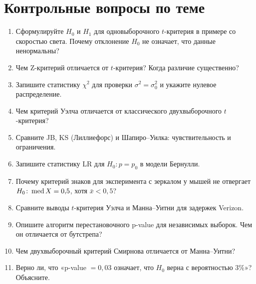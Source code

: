 \section{Контрольные вопросы по теме}

\begin{enumerate}
    \item Сформулируйте $H_0$ и $H_1$ для одновыборочного $t$-критерия
          в примере со скоростью света. Почему отклонение $H_0$ не означает, что данные ненормальны?
    \item Чем Z-критерий отличается от $t$-критерия? Когда различие существенно?
    \item Запишите статистику $\chi^2$ для проверки $\sigma^2=\sigma_0^2$
          и укажите нулевое распределение.
    \item Чем критерий Уэлча отличается от классического двухвыборочного
          $t$-критерия?
    \item Сравните JB, KS (Лиллиефорс) и Шапиро--Уилка: чувствительность
          и ограничения.
    \item Запишите статистику LR для $H_0\colon p=p_0$ в модели Бернулли.
    \item Почему критерий знаков для эксперимента с зеркалом у мышей не отвергает
          $H_0\colon \operatorname{med} X=0{,}5$, хотя $\bar x<0{,}5$?
    \item Сравните выводы $t$-критерия Уэлча и Манна--Уитни для
          задержек Verizon.
    \item Опишите алгоритм перестановочного p-value для независимых выборок.
          Чем он отличается от бутстрепа?
    \item Чем двухвыборочный критерий Смирнова отличается от Манна--Уитни?
    \item Верно ли, что «p-value $=0{,}03$ означает, что $H_0$ верна с вероятностью 3\%»? Объясните.
\end{enumerate}
